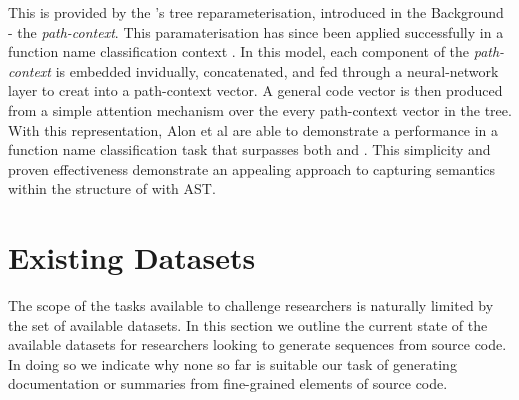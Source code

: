 This is provided by the \citet{alon_general_2018}'s tree reparameterisation, introduced in the Background - the \textit{path-context}.
This paramaterisation has since been applied successfully in a function name classification context \citep{alon_code2vec_2018}.
In this model, each component of the \textit{path-context} is embedded invidually, concatenated, and fed through a neural-network layer to creat into a path-context vector.
A general code vector is then produced from a simple attention mechanism over the every path-context vector in the tree. 
With this representation, Alon et al are able to demonstrate a performance in a function name classification task that surpasses both \citet{allamanis_convolutional_2016} and \citet{iyer_summarizing_2016}. This simplicity and proven effectiveness demonstrate an appealing approach to capturing semantics within the structure of with AST.

\section{Existing Datasets}
\label{sec:existing_datasets}

The scope of the tasks available to challenge researchers is naturally limited by the set of available datasets.
In this section we outline the current state of the available datasets for researchers looking to generate sequences from source code. In doing so we indicate why none so far is suitable our task of generating documentation or summaries from fine-grained elements of source code.

